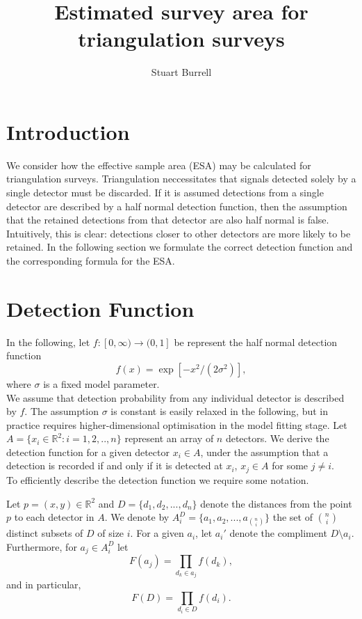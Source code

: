 \documentclass{lms}
\title[]{Estimated survey area for triangulation surveys}
\author{Stuart Burrell}
\begin{document}
\maketitle

\section{Introduction}\label{Introduction} 
We consider how the effective sample area (ESA) may be calculated for triangulation surveys. Triangulation neccessitates that signals detected solely by a single detector must be discarded. If it is assumed detections from a single detector are described by a half normal detection function, then the assumption that the retained detections from that detector are also half normal is false. Intuitively, this is clear: detections closer to other detectors are more likely to be retained. In the following section we formulate the correct detection function and the corresponding formula for the ESA.

\section{Detection Function}
In the following, let $f : [0, \infty) \rightarrow (0, 1]$ be represent the half normal detection function
\begin{equation}
f(x) = \exp{\left[-x^2 / (2 \sigma^2)\right]},
\end{equation}
where $\sigma$ is a fixed model parameter.\\

We assume that detection probability from any individual detector is described by $f$. The assumption $\sigma$ is constant is easily relaxed in the following, but in practice requires higher-dimensional optimisation in the model fitting stage. Let $A = \{x_i \in \mathbb{R}^2 : i = 1, 2, .. , n\}$ represent an array of $n$ detectors. We derive the detection function for a given detector $x_i \in A$, under the assumption that a detection is recorded if and only if it is detected at $x_i$, $x_j \in A$ for some $j \neq i$.\\

To efficiently describe the detection function we require some notation.
\begin{definition}
Let $p = (x, y) \in \mathbb{R}^2$ and $D = \{d_1, d_2, ..., d_n\}$ denote the distances from the point $p$ to each detector in $A$.
We denote by $A_i^D = \{a_1, a_2, ..., a_{n \choose i}\}$ the set of $n \choose i$ distinct subsets of $D$ of size $i$. For a given $a_i$, let $a_i'$ denote the compliment $D \setminus a_i$. Furthermore, for $a_j \in A_i^D$ let
\begin{equation}
F(a_j) = \prod\limits_{d_k \in a_j} f(d_k),
\end{equation}
and in particular,
\begin{equation}
F(D) = \prod\limits_{d_i \in D} f(d_i).
\end{equation}
\end{definition}
\end{document}
